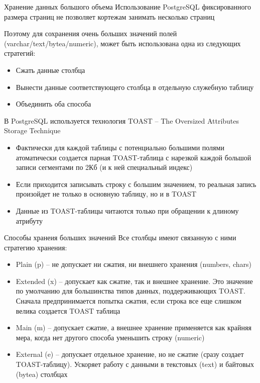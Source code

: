 \documentclass[12pt]{article}
\begin{document}
\begin{nota}{Хранение данных большого объема}
    Использование PostgreSQL фиксированного размера страниц не позволяет кортежам занимать несколько страниц 

    Поэтому для сохранения очень больших значений полей (varchar/text/bytea/numeric), может быть использована одна из следующих стратегий: 

    \begin{itemize}
        \item Сжать данные столбца 
        \item Вынести данные соответствующего столбца в отдельную служебную таблицу 
        \item Объединить оба способа 
    \end{itemize}

    В PostgreSQL используется технология TOAST -- The Oversized Attributes Storage Technique

    \begin{itemize}
        \item Фактически для каждой таблицы с потенциально большими полями атоматически создается парная TOAST-таблица с нарезкой каждой большой записи сегментами по 2Кб (и к ней специальный индекс)
        \item Если приходится записывать строку с большим значением, то реальная запись произойдет не только в основную таблицу, но и в TOAST 
        \item Данные из TOAST-таблицы читаются только при обращении к длиному атрибуту 
    \end{itemize}
\end{nota}

\begin{nota}{Способы хранеия больших значений}
    Все столбцы имеют связанную с ними стратегию хранения:

    \begin{itemize}
        \item Plain (p) -- не допускает ни сжатия, ни внешнего хранения (numbers, chars)
        \item Extended (x) -- допускает как сжатие, так и внешнее хранение. Это значение по умолчанию для большинства типов данных, поддерживающих TOAST. Сначала предпринимается попытка сжатия, если строка все еще слишком велика создается TOAST таблица 
        \item Main (m) -- допускает сжатие, а внешнее хранение применяется как крайняя мера, когда нет другого способа уменьшить строку (numeric)
        \item External (e) -- допускает отдельное хранение, но не сжатие (сразу создает TOAST-таблицу). Ускоряет работу с данными в текстовых (text) и байтовых (bytea) столбцах 
    \end{itemize}
\end{nota}
\end{document}
